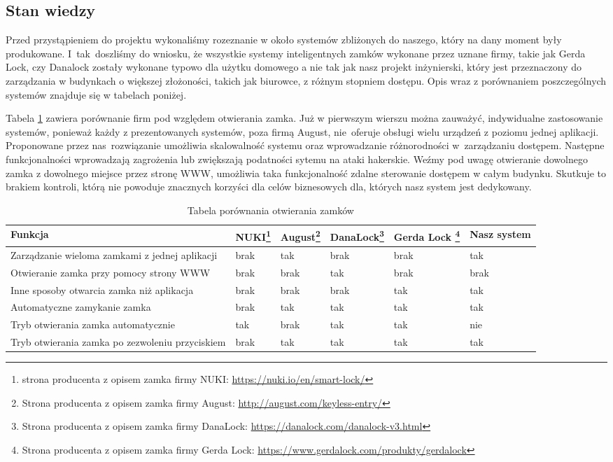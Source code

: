 \subsection{Stan wiedzy}\label{sec:Stan wiedzy}
Przed przystąpieniem do projektu wykonaliśmy rozeznanie w około systemów zbliżonych do naszego, który na dany moment były produkowane. I~tak~doszliśmy do wniosku, że wszystkie systemy inteligentnych zamków wykonane przez uznane firmy, takie jak Gerda Lock, czy Danalock zostały wykonane typowo dla użytku domowego a nie tak jak nasz projekt inżynierski, który jest przeznaczony do zarządzania w budynkach o większej złożoności, takich jak biurowce, z różnym stopniem dostępu. Opis wraz z porównaniem poszczególnych systemów znajduje się w tabelach poniżej.

Tabela \ref{tab:porownanie1} zawiera porównanie firm pod względem otwierania zamka. Już w pierwszym wierszu można zauważyć, indywidualne zastosowanie systemów, ponieważ każdy z prezentowanych systemów, poza firmą August, nie~oferuje obsługi wielu urządzeń z poziomu jednej aplikacji. Proponowane przez nas~rozwiązanie umożliwia skalowalność systemu oraz wprowadzanie różnorodności w~zarządzaniu dostępem. Następne funkcjonalności wprowadzają zagrożenia lub zwiększają podatności sytemu na ataki hakerskie. Weźmy pod uwagę otwieranie dowolnego zamka z dowolnego miejsce przez stronę WWW, umożliwia taka funkcjonalność zdalne sterowanie dostępem w całym budynku. Skutkuje to brakiem kontroli, którą nie powoduje znacznych korzyści dla celów biznesowych dla, których nasz system jest dedykowany.
\newpage
	\begin{longtable}[!ht]{|m{6cm}|m{1.4cm}|m{1.4cm}|m{1.7cm}|m{2cm}|m{2cm}|} 
		\caption{Tabela porównania otwierania zamków}
		\label{tab:porownanie1}\\
		\hline	
		Funkcja & NUKI\footnote{ strona producenta z opisem zamka firmy NUKI: \href{https://nuki.io/en/smart-lock/}{https://nuki.io/en/smart-lock/}} & August\footnote{ Strona producenta z opisem zamka firmy August: \href{http://august.com/keyless-entry/ }{http://august.com/keyless-entry/}} & DanaLock\footnote{ Strona producenta z opisem zamka firmy DanaLock: \href{https://danalock.com/danalock-v3.html}{https://danalock.com/danalock-v3.html}} &
		 Gerda Lock \footnote{ Strona producenta z opisem zamka firmy Gerda Lock: \href{https://www.gerdalock.com/produkty/gerdalock}{https://www.gerdalock.com/produkty/gerdalock}} & 
		 Nasz system  \\	\hline
		 Zarządzanie wieloma zamkami z jednej aplikacji
		 & brak & tak & brak & brak & tak \\	\hline
		Otwieranie zamka przy pomocy strony WWW
		& brak & brak & tak & brak & brak \\	\hline
		Inne sposoby otwarcia zamka niż aplikacja
		& brak & brak & brak & tak & tak \\	\hline
		Automatyczne zamykanie zamka
		& brak & tak & tak & tak & tak \\	\hline
		Tryb otwierania zamka automatycznie
		& tak& brak & tak & tak & nie \\	\hline	
		Tryb otwierania zamka po zezwoleniu przyciskiem
		& brak & tak & tak & tak & tak \\		\hline
	\end{longtable}

